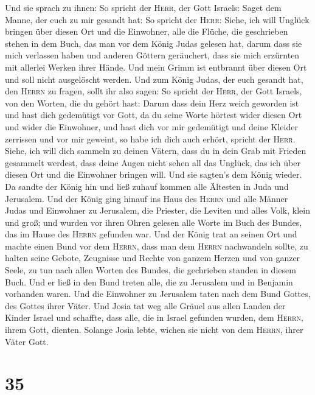  Und sie sprach zu ihnen: So spricht der \textsc{Herr},
der Gott Israels: Saget dem Manne, der euch zu mir gesandt hat:
 So spricht der \textsc{Herr}: Siehe, ich will Unglück
bringen über diesen Ort und die Einwohner, alle die Flüche, die
geschrieben stehen in dem Buch, das man vor dem König Judas gelesen hat,
 darum dass sie mich verlassen haben und anderen Göttern
geräuchert, dass sie mich erzürnten mit allerlei Werken ihrer Hände. Und
mein Grimm ist entbrannt über diesen Ort und soll nicht ausgelöscht
werden.  Und zum König Judas, der euch gesandt hat, den
\textsc{Herrn} zu fragen, sollt ihr also sagen: So spricht der
\textsc{Herr}, der Gott Israels, von den Worten, die du gehört hast:
 Darum dass dein Herz weich geworden ist und hast dich
gedemütigt vor Gott, da du seine Worte hörtest wider diesen Ort und
wider die Einwohner, und hast dich vor mir gedemütigt und deine Kleider
zerrissen und vor mir geweint, so habe ich dich auch erhört, spricht der
\textsc{Herr}.  Siehe, ich will dich sammeln zu deinen
Vätern, dass du in dein Grab mit Frieden gesammelt werdest, dass deine
Augen nicht sehen all das Unglück, das ich über diesen Ort und die
Einwohner bringen will. Und sie sagten's dem König wieder.
 Da sandte der König hin und ließ zuhauf kommen alle
Ältesten in Juda und Jerusalem.  Und der König ging
hinauf ins Haus des \textsc{Herrn} und alle Männer Judas und Einwohner
zu Jerusalem, die Priester, die Leviten und alles Volk, klein und groß;
und wurden vor ihren Ohren gelesen alle Worte im Buch des Bundes, das im
Hause des \textsc{Herrn} gefunden war.  Und der König
trat an seinen Ort und machte einen Bund vor dem \textsc{Herrn}, dass
man dem \textsc{Herrn} nachwandeln sollte, zu halten seine Gebote,
Zeugnisse und Rechte von ganzem Herzen und von ganzer Seele, zu tun nach
allen Worten des Bundes, die gechrieben standen in diesem Buch.
 Und er ließ in den Bund treten alle, die zu Jerusalem
und in Benjamin vorhanden waren. Und die Einwohner zu Jerusalem taten
nach dem Bund Gottes, des Gottes ihrer Väter.  Und Josia
tat weg alle Gräuel aus allen Landen der Kinder Israel und schaffte,
dass alle, die in Israel gefunden wurden, dem \textsc{Herrn}, ihrem
Gott, dienten. Solange Josia lebte, wichen sie nicht von dem
\textsc{Herrn}, ihrer Väter Gott.

\hypertarget{section-34}{%
\section{35}\label{section-34}}

